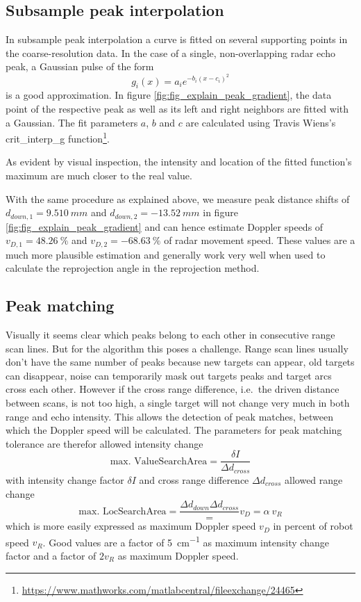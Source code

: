 \subsection{Subsample peak interpolation}\label{subsample-peak-interpolation}

In subsample peak interpolation a curve is fitted on several supporting
points in the coarse-resolution data. In the case of a single,
non-overlapping radar echo peak, a Gaussian pulse of the form
\[g_i(x) = a_i e^{-b_i ( x - c_i )^2}\] is a good approximation. In
figure \cref{fig:fig_explain_peak_gradient}, the data point of the respective peak as well as its left
and right neighbors are fitted with a Gaussian. The fit parameters
\(a\), \(b\) and \(c\) are calculated using Travis
Wiens's crit\_interp\_g function\footnote{\url{https://www.mathworks.com/matlabcentral/fileexchange/24465}}.

As evident by visual inspection, the intensity and location of the
fitted function's maximum are much closer to the real value.

With the same procedure as explained above, we measure peak distance
shifts of \(d_{down,1}=\SI{9.510}{mm}\) and \(d_{down,2}=-\SI{13.52}{mm}\) in figure
\cref{fig:fig_explain_peak_gradient} and can hence estimate Doppler speeds of \(v_{D,1}=\SI{48.26}{\%}\) and
\(v_{D,2}=-\SI{68.63}{\%}\) of radar movement speed. These values are a much
more plausible estimation and generally work very well when used to
calculate the reprojection angle in the reprojection method.

\subsection{Peak matching}\label{peak-matching}

Visually it seems clear which peaks belong to each other in consecutive
range scan lines. But for the algorithm this poses a challenge. Range
scan lines usually don't have the same number of peaks because new
targets can appear, old targets can disappear, noise can temporarily
mask out targets peaks and target arcs cross each other. However if the
cross range difference, i.e.~the driven distance between scans, is not
too high, a single target will not change very much in both range and
echo intensity. This allows the detection of peak matches, between which
the Doppler speed will be calculated. The parameters for peak matching
tolerance are therefor allowed intensity change
\[
    \text{max. ValueSearchArea} = \frac{\delta I}{\Delta d_{cross}}
\]
with intensity change factor \(\delta I\) and cross range difference
\(\Delta d_{cross}\) allowed range change
\[
    \text{max. LocSearchArea} = \frac{\Delta d_{down}{\Delta d_{cross}}} = v_D = \alpha~v_R
\]
which is more easily expressed as maximum Doppler speed \(v_D\) in
percent of robot speed \(v_R\). Good values are a factor of
\SI{5}{cm^{-1}} as maximum intensity change factor and a factor of
\(2 v_R\) as maximum Doppler speed.


